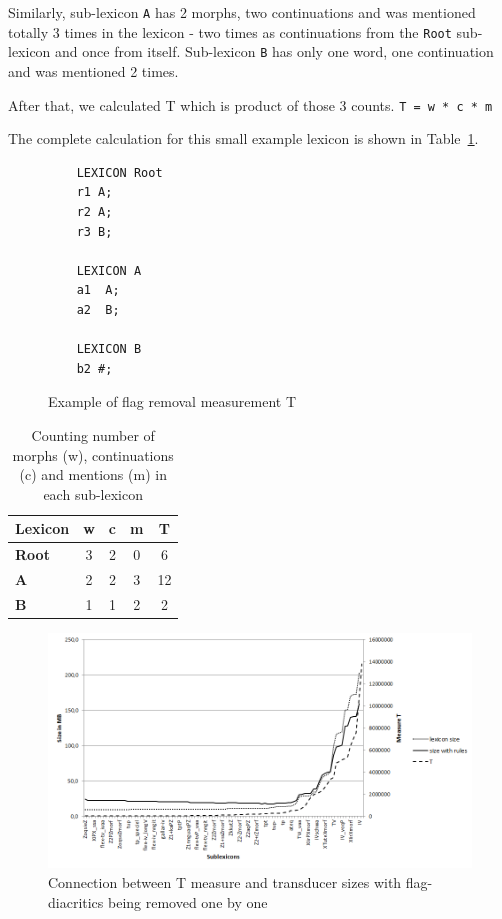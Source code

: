 \documentclass[10pt, a4paper]{article}
\begin{document}
Similarly, sub-lexicon \verb+A+ has 2 morphs, two continuations and was mentioned totally 3 times in the lexicon - 
two times as continuations from the \verb+Root+ sub-lexicon and once from itself. Sub-lexicon \verb+B+ has only one word, one continuation and was mentioned 2 times. 

After that, we calculated T which is product of 
those 3 counts.
\verb+T = w * c * m+

The complete calculation for this small example lexicon is shown in Table~\ref{table:measureP}.

\begin{figure}
\centering
\begin{verbatim}
    LEXICON Root
    r1 A;
    r2 A;
    r3 B;
    
    LEXICON A
    a1  A;
    a2  B;
    
    LEXICON B
    b2 #;
    \end{verbatim}
  
    \caption{Example of flag removal measurement T
    \label{fig:lexc-measures}}
\end{figure}

\begin{table}
    \centering
    \begin{tabular}{|l|c|c|c|c|}
        \hline
        \bf Lexicon & \bf w & \bf c & \bf m & \bf T \\
        \hline\hline
        \bf Root & 3 & 2 & 0 & 6  \\
        \bf A & 2 & 2 & 3 & 12 \\
        \bf B  & 1 & 1 & 2 & 2 \\
        \hline
    \end{tabular}
    \caption{Counting number of morphs (w), continuations (c) and mentions (m) in each sub-lexicon
    \label{table:measureP}}
\end{table}



\begin{figure}
    \includegraphics[width=\textwidth]{t-measure.png}
     \caption{Connection between T measure and transducer sizes with flag-diacritics being removed one by one
     \label{fig:p-measure-sizes}}
\end{figure}
\end{document}

